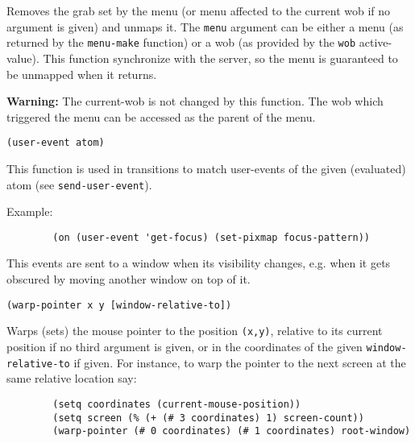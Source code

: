 Removes the grab set by the menu (or menu affected to the current wob if no
argument is given) and unmaps it. The {\tt menu} argument can be either a
menu (as returned by the \verb"menu-make" function) or a wob (as provided by
the \verb"wob" active-value). This function synchronize {\GWM} with the
server, so the menu is guaranteed to be unmapped when it returns.

{\bf Warning:} The current-wob is not changed by this function. The wob
which triggered the menu can be accessed as the parent of the menu.

        
{\usagefont\begin{verbatim}
(user-event atom)
\end{verbatim}}\usageupspace

This function is used in transitions to match user-events of the given
(evaluated) atom (see \verb"send-user-event").

Example:
{\exemplefont\upspace\begin{verbatim}
        (on (user-event 'get-focus) (set-pixmap focus-pattern))
\end{verbatim}}



This events are sent to a window when its visibility changes, e.g.
when it gets obscured by moving another window on top of it.


{\usagefont\begin{verbatim}
(warp-pointer x y [window-relative-to])
\end{verbatim}}\usageupspace

Warps (sets) the mouse pointer to the position \verb"(x,y)", relative to
its current position if no third argument is given, or in the
coordinates of the given \verb"window-relative-to" if given.
For instance, to warp the pointer to the next screen at the same relative
location say:

{\exemplefont\begin{verbatim}
        (setq coordinates (current-mouse-position))
        (setq screen (% (+ (# 3 coordinates) 1) screen-count))
        (warp-pointer (# 0 coordinates) (# 1 coordinates) root-window)
\end{verbatim}}


